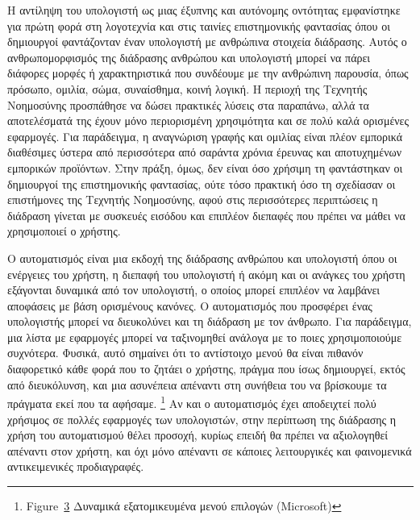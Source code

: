 \documentclass[
]{article}
\begin{document}
Η αντίληψη του υπολογιστή ως μιας έξυπνης και αυτόνομης οντότητας
εμφανίστηκε για πρώτη φορά στη λογοτεχνία και στις ταινίες επιστημονικής
φαντασίας όπου οι δημιουργοί φαντάζονταν έναν υπολογιστή με ανθρώπινα
στοιχεία διάδρασης. Αυτός ο ανθρωπομορφισμός της διάδρασης ανθρώπου και
υπολογιστή μπορεί να πάρει διάφορες μορφές ή χαρακτηριστικά που
συνδέουμε με την ανθρώπινη παρουσία, όπως πρόσωπο, ομιλία, σώμα,
συναίσθημα, κοινή λογική. Η περιοχή της Τεχνητής Νοημοσύνης προσπάθησε
να δώσει πρακτικές λύσεις στα παραπάνω, αλλά τα αποτελέσματά της έχουν
μόνο περιορισμένη χρησιμότητα και σε πολύ καλά ορισμένες εφαρμογές. Για
παράδειγμα, η αναγνώριση γραφής και ομιλίας είναι πλέον εμπορικά
διαθέσιμες ύστερα από περισσότερα από σαράντα χρόνια έρευνας και
αποτυχημένων εμπορικών προϊόντων. Στην πράξη, όμως, δεν είναι όσο
χρήσιμη τη φαντάστηκαν οι δημιουργοί της επιστημονικής φαντασίας, ούτε
τόσο πρακτική όσο τη σχεδίασαν οι επιστήμονες της Τεχνητής Νοημοσύνης,
αφού στις περισσότερες περιπτώσεις η διάδραση γίνεται με συσκευές
εισόδου και επιπλέον διεπαφές που πρέπει να μάθει να χρησιμοποιεί ο
χρήστης.

Ο αυτοματισμός είναι μια εκδοχή της διάδρασης ανθρώπου και υπολογιστή
όπου οι ενέργειες του χρήστη, η διεπαφή του υπολογιστή ή ακόμη και οι
ανάγκες του χρήστη εξάγονται δυναμικά από τον υπολογιστή, ο οποίος
μπορεί επιπλέον να λαμβάνει αποφάσεις με βάση ορισμένους κανόνες. Ο
αυτοματισμός που προσφέρει ένας υπολογιστής μπορεί να διευκολύνει και τη
διάδραση με τον άνθρωπο. Για παράδειγμα, μια λίστα με εφαρμογές μπορεί
να ταξινομηθεί ανάλογα με το ποιες χρησιμοποιούμε συχνότερα. Φυσικά,
αυτό σημαίνει ότι το αντίστοιχο μενού θα είναι πιθανόν διαφορετικό κάθε
φορά που το ζητάει ο χρήστης, πράγμα που ίσως δημιουργεί, εκτός από
διευκόλυνση, και μια ασυνέπεια απέναντι στη συνήθεια του να βρίσκουμε τα
πράγματα εκεί που τα αφήσαμε. \footnote{Figure~\protect\hyperlink{fig:adaptive-menus}{3}
  Δυναμικά εξατομικευμένα μενού επιλογών (Microsoft)} Αν και ο
αυτοματισμός έχει αποδειχτεί πολύ χρήσιμος σε πολλές εφαρμογές των
υπολογιστών, στην περίπτωση της διάδρασης η χρήση του αυτοματισμού θέλει
προσοχή, κυρίως επειδή θα πρέπει να αξιολογηθεί απέναντι στον χρήστη,
και όχι μόνο απέναντι σε κάποιες λειτουργικές και φαινομενικά
αντικειμενικές προδιαγραφές.
\end{document}
